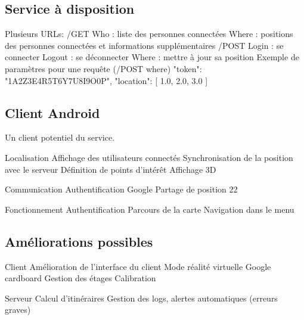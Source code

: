 \documentclass{beamer} %
\begin{document}
  \subsection{Service à disposition}
  \begin{frame}{\subsecname}
    Plusieurs URLs:
    /GET
    Who : liste des personnes connectées
    Where : positions des personnes connectées et informations supplémentaires
    /POST
    Login : se connecter
    Logout : se déconnecter
    Where : mettre à jour sa position
    Exemple de paramètres pour une requête (/POST where){
        "token": "1A2Z3E4R5T6Y7U8I9O0P",
        "location": [
            1.0,
            2.0,
            3.0
        ]
    }  
  \end{frame}

  \subsection{Client Android}
  \begin{frame}{\subsecname}
    Un client potentiel du service.

    Localisation
    Affichage des utilisateurs connectés
    Synchronisation de la position avec le serveur
    Définition de points d’intérêt
    Affichage 3D

    Communication
    Authentification Google
    Partage de position
    22

    Fonctionnement
    Authentification
    Parcours de la carte
    Navigation dans le menu
    
  \end{frame}

  \subsection{Améliorations possibles}
  \begin{frame}{\subsecname}
    Client
      Amélioration de l’interface du client
      Mode réalité virtuelle
        Google cardboard
      Gestion des étages
        Calibration

    Serveur
      Calcul d’itinéraires
      Gestion des logs, alertes automatiques (erreurs graves)
    
  \end{frame}
  
\end{document}

